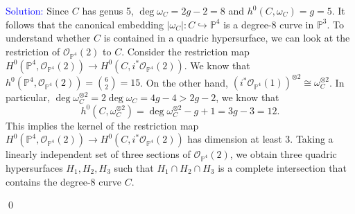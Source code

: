\documentclass[11pt]{article}
\newcommand{\PP}{\mathbb{P}}
\newcommand{\cO}{\mathcal{O}}
\newenvironment{solution}{\begin{trivlist}\item[]{\textcolor{blue}{Solution:}}}{\qed \end{trivlist}}
\begin{document}
\begin{solution}
    Since $C$ has genus 5, $\deg \omega_C = 2g - 2 = 8$ and $h^0(C, \omega_C) = g = 5$. It follows that the canonical embedding $|\omega_C| : C \hookrightarrow \PP^4$ is a degree-8 curve in $\PP^3$. To understand whether $C$ is contained in a quadric hypersurface, we can look at the restriction of $\cO_{\PP^4}(2)$ to $C$. Consider the restriction map $H^0(\PP^4, \cO_{\PP^4}(2)) \rightarrow H^0(C, i^* \cO_{\PP^4}(2))$. We know that $h^0(\PP^4, \cO_{\PP^4}(2)) = \binom{6}{2} = 15$. On the other hand, $(i^* \cO_{\PP^4}(1))^{\otimes 2} \cong \omega_C^{\otimes 2}$. In particular, $\deg \omega_C^{\otimes 2} = 2 \deg \omega_C = 4g - 4 > 2g - 2$, we know that 
    \[
        h^0(C, \omega_C^{\otimes 2})
        = \deg \omega_C^{\otimes 2} - g + 1 
        = 3g - 3 
        = 12.
    \]  
    This implies the kernel of the restriction map $H^0(\PP^4, \cO_{\PP^4}(2)) \rightarrow H^0(C, i^* \cO_{\PP^4}(2))$ has dimension at least 3. Taking a linearly independent set of three sections of $\cO_{\PP^4}(2)$, we obtain three quadric hypersurfaces $H_1, H_2, H_3$ such that $H_1 \cap H_2 \cap H_3$ is a complete intersection that contains the degree-8 curve $C$.


\end{solution}
\end{document}
